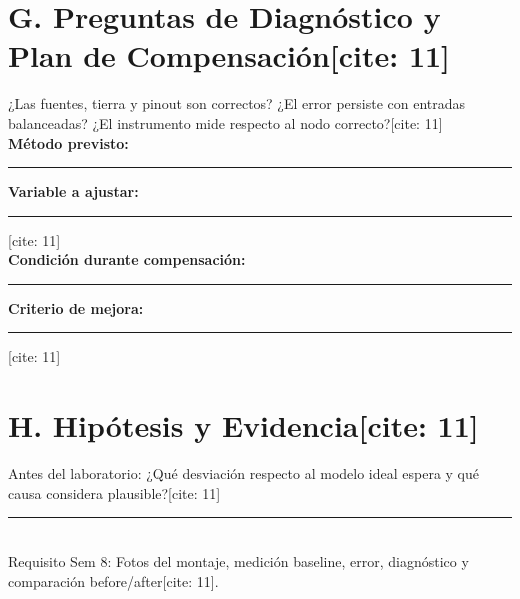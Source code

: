 \documentclass[11pt, a4paper]{article}
\begin{document}
\section*{G. Preguntas de Diagnóstico y Plan de Compensación[cite: 11]}
¿Las fuentes, tierra y pinout son correctos? ¿El error persiste con entradas balanceadas? ¿El instrumento mide respecto al nodo correcto?[cite: 11] \\
\textbf{Método previsto:} \rule{6cm}{0.4pt} \textbf{Variable a ajustar:} \rule{4cm}{0.4pt}[cite: 11] \\
\textbf{Condición durante compensación:} \rule{4cm}{0.4pt} \textbf{Criterio de mejora:} \rule{3cm}{0.4pt}[cite: 11] \\

\section*{H. Hipótesis y Evidencia[cite: 11]}
Antes del laboratorio: ¿Qué desviación respecto al modelo ideal espera y qué causa considera plausible?[cite: 11] \\
\rule{\textwidth}{0.4pt} \\
Requisito Sem 8: Fotos del montaje, medición baseline, error, diagnóstico y comparación before/after[cite: 11].
\end{document}
